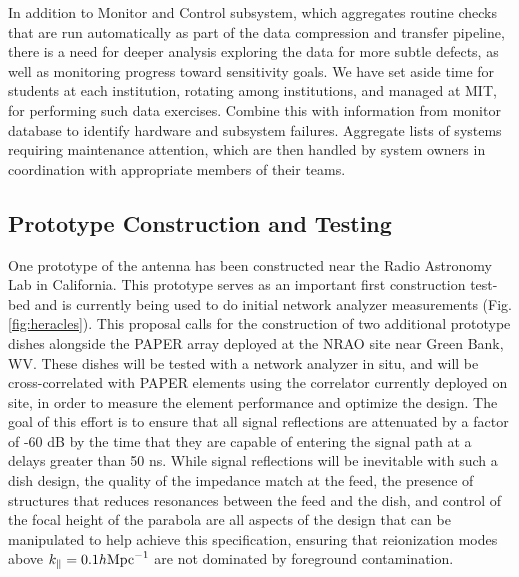 \documentclass[preprint]{aastex}
\begin{document}

In addition to Monitor and Control subsystem, which aggregates routine checks that are run automatically as
part of the data compression and transfer pipeline, there is a need for deeper analysis
exploring the data for more subtle defects, as well as monitoring progress toward sensitivity goals.
We have set aside time for students at each institution, rotating among institutions, and managed at MIT,
for performing such data exercises.
Combine this with information from monitor database to identify hardware and subsystem failures.
Aggregate lists of systems requiring maintenance attention, which are then handled by system owners
in coordination with appropriate members of their teams.

\vspace{-0.25in}
\subsection{Prototype Construction and Testing}
\vspace{-6pt}

One prototype of the antenna has been constructed near the Radio Astronomy Lab in California. 
This prototype serves as an important first construction test-bed and is currently being used to do 
initial network analyzer measurements (Fig. \ref{fig:heracles}).
This proposal calls for the construction of two additional prototype dishes alongside
the PAPER array deployed at the NRAO site near Green Bank, WV.
These dishes will be tested
with a network analyzer in situ, and will be cross-correlated with PAPER elements using
the correlator currently deployed on site, in order to measure
the element performance and optimize the design.  The goal of this effort is to ensure
that all signal reflections
are attenuated by a factor of -60 dB by the time that they are capable of entering the signal path
at a delays greater than 50 ns.  While signal reflections will be inevitable with such a dish
design, the quality of the impedance match at the feed,
the presence of structures that reduces resonances between
the feed and the dish, and control of the focal height of the parabola are all aspects
of the design that can
be manipulated to help achieve this specification, ensuring that reionization modes above
$k_\parallel=0.1h {\rm Mpc}^{-1}$ are not dominated by foreground contamination.
\end{document}
